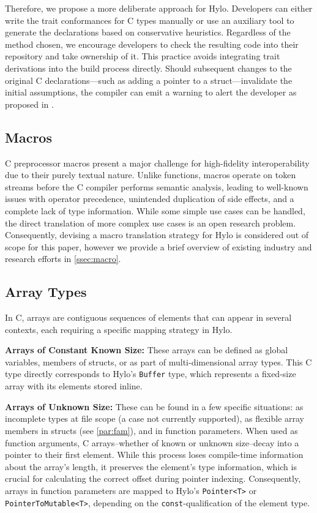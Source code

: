 Therefore, we propose a more deliberate approach for Hylo. Developers can either write the trait conformances for C types manually or use an auxiliary tool to generate the declarations based on conservative heuristics. Regardless of the method chosen, we encourage developers to check the resulting code into their repository and take ownership of it. This practice avoids integrating trait derivations into the build process directly. Should subsequent changes to the original C declarations—such as adding a pointer to a struct—invalidate the initial assumptions, the compiler can emit a warning to alert the developer as proposed in \cite{hylo-trait-ptr-conformance-warning}.

\subsection{Macros}
C preprocessor macros present a major challenge for high-fidelity interoperability due to their purely textual nature.  Unlike functions, macros operate on token streams before the C compiler performs semantic analysis, leading to well-known issues with operator precedence, unintended duplication of side effects, and a complete lack of type information.  While some simple use cases can be handled, the direct translation of more complex use cases is an open research problem. Consequently, devising a macro translation strategy for Hylo is considered out of scope for this paper, however we provide a brief overview of existing industry and research efforts in \autoref{ssec:macro}.

\subsection{Array Types}
In C, arrays are contiguous sequences of elements that can appear in several contexts\cite{carrays}, each requiring a specific mapping strategy in Hylo.

\textbf{Arrays of Constant Known Size:} These arrays can be defined as global variables, members of structs, or as part of multi-dimensional array types. This C type directly corresponds to Hylo's \texttt{Buffer} type, which represents a fixed-size array with its elements stored inline.

\textbf{Arrays of Unknown Size:} These can be found in a few specific situations: as incomplete types at file scope (a case not currently supported), as flexible array members in structs (see \autoref{par:fam}), and in function parameters. When used as function arguments, C arrays--whether of known or unknown size--decay into a pointer to their first element. While this process loses compile-time information about the array's length, it preserves the element's type information, which is crucial for calculating the correct offset during pointer indexing. Consequently, arrays in function parameters are mapped to Hylo's \texttt{Pointer<T>} or \texttt{PointerToMutable<T>}, depending on the \texttt{const}-qualification of the element type.

